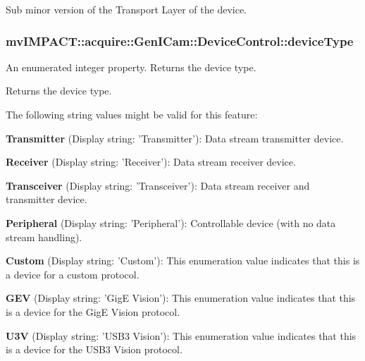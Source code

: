 Sub minor version of the Transport Layer of the device. \hypertarget{classmv_i_m_p_a_c_t_1_1acquire_1_1_gen_i_cam_1_1_device_control_a3dc9c27ac4a77bac7c2590ef4cb56f15}{
\subsubsection[{device\+Type}]{ mv\+I\+M\+P\+A\+C\+T\+::acquire\+::\+Gen\+I\+Cam\+::\+Device\+Control\+::device\+Type}}\label{classmv_i_m_p_a_c_t_1_1acquire_1_1_gen_i_cam_1_1_device_control_a3dc9c27ac4a77bac7c2590ef4cb56f15}


An enumerated integer property. Returns the device type. 

Returns the device type.

The following string values might be valid for this feature\+:
\begin{DoxyItemize}
\item {\bfseries Transmitter} (Display string\+: 'Transmitter')\+: Data stream transmitter device.
\item {\bfseries Receiver} (Display string\+: 'Receiver')\+: Data stream receiver device.
\item {\bfseries Transceiver} (Display string\+: 'Transceiver')\+: Data stream receiver and transmitter device.
\item {\bfseries Peripheral} (Display string\+: 'Peripheral')\+: Controllable device (with no data stream handling).
\item {\bfseries Custom} (Display string\+: 'Custom')\+: This enumeration value indicates that this is a device for a custom protocol.
\item {\bfseries G\+E\+V} (Display string\+: 'Gig\+E Vision')\+: This enumeration value indicates that this is a device for the Gig\+E Vision protocol.
\item {\bfseries U3\+V} (Display string\+: 'U\+S\+B3 Vision')\+: This enumeration value indicates that this is a device for the U\+S\+B3 Vision protocol.
\end{DoxyItemize}

